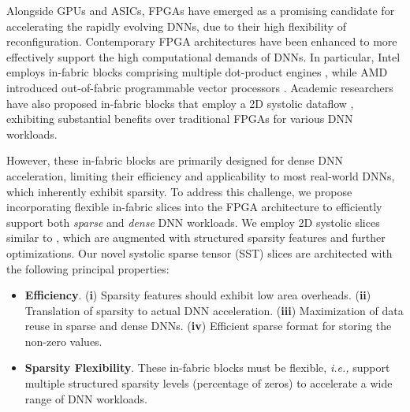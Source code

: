 Alongside GPUs and ASICs, FPGAs have emerged as a promising candidate for accelerating the rapidly evolving DNNs, due to their high flexibility of reconfiguration.
Contemporary FPGA architectures have been enhanced to more  
effectively support the high computational demands of DNNs.
In particular, Intel employs in-fabric blocks comprising multiple dot-product engines \cite{Stratix_10_NX_FPGA_2021, Sergey_Intel_TB_Agilex_5_FCCM_2024}, while AMD introduced out-of-fabric programmable vector processors \cite{AMD_AIE_ML_architecture_manual}.
Academic researchers have also proposed in-fabric blocks that employ a 2D systolic dataflow \cite{TS_Aman_FPGA_2021, Aman_TS_TRETS_2022}, exhibiting substantial benefits over traditional FPGAs for various DNN workloads.



However, these in-fabric blocks are primarily designed for dense DNN acceleration, limiting their efficiency and applicability to most real-world DNNs, which inherently exhibit sparsity.
To address this challenge, we propose incorporating flexible in-fabric slices into the FPGA architecture to efficiently support both \textit{sparse} and \textit{dense} DNN workloads.
We employ 2D systolic slices similar to \cite{TS_Aman_FPGA_2021, Aman_TS_TRETS_2022}, which are augmented with structured sparsity features and further optimizations.
Our novel systolic sparse tensor (SST) slices are architected with the following principal properties: 

\vspace{-0.10cm}
\begin{itemize}
  \item \textbf{Efficiency}. (\textbf{i}) Sparsity features should exhibit low area overheads. (\textbf{ii}) Translation of sparsity to actual DNN acceleration. (\textbf{iii}) Maximization of data reuse in sparse and dense DNNs. (\textbf{iv}) Efficient sparse format for storing the non-zero values. 
  \item \textbf{Sparsity Flexibility}. These in-fabric blocks must be flexible, \emph{i.e.,} support multiple structured sparsity levels (percentage of zeros) to accelerate a wide range of DNN workloads.
\end{itemize}
\vspace{-0.10cm}




